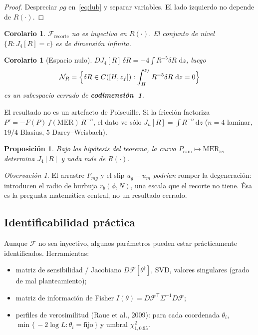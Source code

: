 \documentclass[11pt,a4paper]{article}
\theoremstyle{plain}
\newtheorem{corolario}[teorema]{Corolario}
\newtheorem{proposicion}[teorema]{Proposición}
\theoremstyle{definition}
\theoremstyle{remark}
\newtheorem*{obs}{Observación}
\newcommand{\MER}{\mathrm{MER}}
\newcommand{\dd}{\,\mathrm{d}}
\newcommand{\F}{\mathcal{F}}
\begin{document}
\begin{proof}
Despreciar $\rho g$ en~\eqref{eq:lub} y separar variables. El lado
izquierdo no depende de $R(\cdot)$.
\end{proof}

\begin{corolario}
$\F_{\mathrm{recorte}}$ no es inyectivo en $R(\cdot)$. El conjunto
de nivel $\{R:J_4[R]=c\}$ es de dimensión infinita.
\end{corolario}

\begin{corolario}[Espacio nulo]
$DJ_4[R]\,\delta R=-4\int R^{-5}\delta R\,\dd z$, luego
\[
\mathcal{N}_R
=\Bigl\{\delta R\in C([H,z_f]):
\int_H^{z_f}R^{-5}\delta R\,\dd z=0\Bigr\}
\]
es un subespacio cerrado de \textbf{codimensión~1}.
\end{corolario}

El resultado no es un artefacto de Poiseuille. Si la fricción
factoriza $P'=-F(P)\,f(\MER)\,R^{-n}$, el dato ve sólo
$J_n[R]=\int R^{-n}\dd z$ ($n=4$ laminar, $19/4$ Blasius, $5$
Darcy--Weisbach).

\begin{proposicion}
Bajo las hipótesis del teorema, la curva
$P_{\mathrm{cam}}\mapsto\MER_{ss}$ determina $J_4[R]$ y nada más
de $R(\cdot)$.
\end{proposicion}

\begin{obs}
El arrastre $F_{mg}$ y el slip $u_g-u_m$ \emph{podrían} romper la
degeneración: introducen el radio de burbuja $r_b(\phi,N)$, una
escala que el recorte no tiene. Ésa es la pregunta matemática
central, no un resultado cerrado.
\end{obs}

\subsection{Identificabilidad práctica}

Aunque $\F$ no sea inyectivo, algunos parámetros pueden estar
prácticamente identificados. Herramientas:

\begin{itemize}
\item matriz de sensibilidad / Jacobiano
  $D\F[\theta^\dagger]$, SVD, valores singulares
  (grado de mal planteamiento);
\item matriz de información de Fisher
  $I(\theta)=D\F^{\mathsf T}\Sigma^{-1}D\F$;
\item perfiles de verosimilitud (Raue et al., 2009): para cada
  coordenada $\theta_i$,
  $\min\{\,{-}2\log L:\theta_i=\mathrm{fijo}\,\}$
  y umbral $\chi^2_{1,0.95}$.
\end{itemize}
\end{document}
